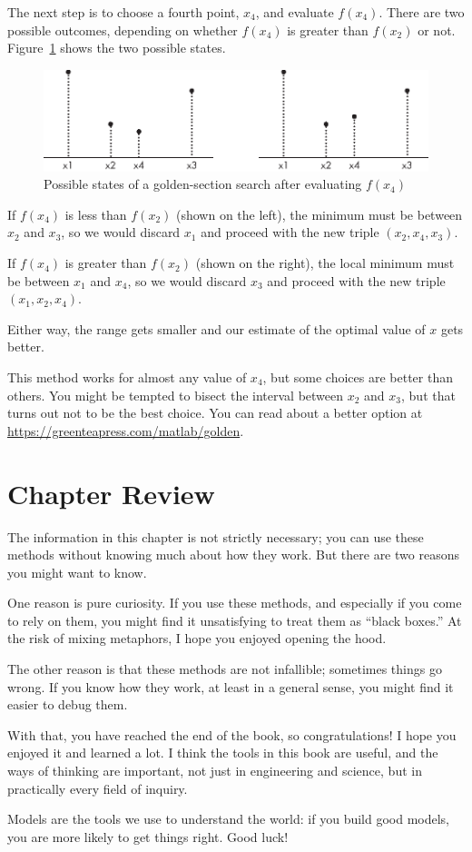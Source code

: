 
The next step is to choose a fourth point, $x_4$, and evaluate
$f(x_4)$.  There are two possible outcomes, depending on whether
$f(x_4)$ is greater than $f(x_2)$ or not.
Figure~\ref{fig:golden2} shows the two possible states.

\begin{figure}[h]
\centerline{\includegraphics[scale=0.8]{images/figure15_05_new.eps}}
\caption{Possible states of a golden-section search after evaluating $f(x_4)$}
\label{fig:golden2}
\end{figure}

If $f(x_4)$ is less than $f(x_2)$ (shown on the left), the
minimum must be between $x_2$ and $x_3$, so we would discard $x_1$ and proceed with the new triple $(x_2, x_4, x_3)$.

If $f(x_4)$ is greater than $f(x_2)$ (shown on the right), the
local minimum must be between $x_1$ and $x_4$, so we would discard $x_3$ and proceed with the new triple $(x_1, x_2, x_4)$.

Either way, the range gets smaller and our estimate of the optimal value of $x$ gets better.

This method works for almost any value of $x_4$, but some choices
are better than others.  You might be tempted to bisect the interval between $x_2$ and $x_3$, but that turns out not to be the best choice.  You can read about a better option at \url{https://greenteapress.com/matlab/golden}.

\section{Chapter Review}

The information in this chapter is not strictly necessary; you can use these methods without knowing much about how they work.  But there are two reasons you might want to know.

One reason is pure curiosity.  If you use these methods, and especially if you come to rely on them, you might find it unsatisfying to treat them as ``black boxes.''  At the risk of mixing metaphors, I hope you enjoyed opening the hood.

The other reason is that these methods are not infallible; sometimes things go wrong.  If you know how they work, at least in a general sense, you might find it easier to debug them.

With that, you have reached the end of the book, so congratulations!  I hope you enjoyed it and learned a lot.  I think the tools in this book are useful, and the ways of thinking are important, not just in engineering and science, but in practically every field of inquiry.

Models are the tools we use to understand the world: if you build good models, you are more likely to get things right.  Good luck!

